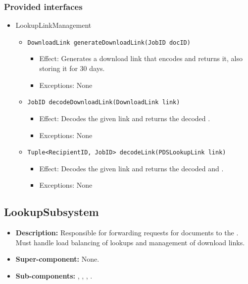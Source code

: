 \subsubsection*{Provided interfaces}
\begin{itemize}
    \item LookupLinkManagement
    \begin{itemize}
        \item \texttt{DownloadLink generateDownloadLink(JobID docID)}
        \begin{itemize}
            \item Effect: Generates a download link that encodes  and returns it, also storing it for 30 days.
            \item Exceptions: None
        \end{itemize}

        \item \texttt{JobID decodeDownloadLink(DownloadLink link)}
		    \begin{itemize}
                \item Effect: Decodes the given link and returns the decoded .
                \item Exceptions: None
            \end{itemize}

		\item \texttt{Tuple<RecipientID, JobID> decodeLink(PDSLookupLink link)}
		    \begin{itemize}
                \item Effect: Decodes the given link and returns the decoded  and .
                \item Exceptions: None
            \end{itemize}
    \end{itemize}
\end{itemize}

\subsection{LookupSubsystem}
\begin{itemize}
    \item \textbf{Description:} Responsible for forwarding requests for documents to the . Must handle load balancing of lookups and management of download links.
    \item \textbf{Super-component:} None.
    \item \textbf{Sub-components:}  , , , .
\end{itemize}

